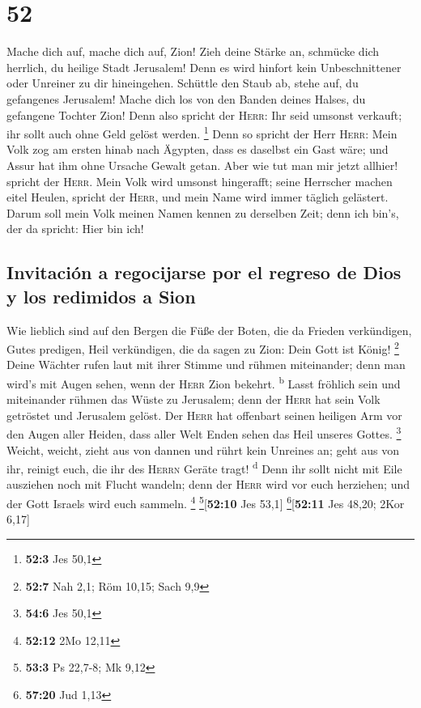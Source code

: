 \hypertarget{section-51}{%
\section{52}\label{section-51}}

 Mache dich auf, mache dich auf, Zion! Zieh deine Stärke
an, schmücke dich herrlich, du heilige Stadt Jerusalem! Denn es wird
hinfort kein Unbeschnittener oder Unreiner zu dir hineingehen.
 Schüttle den Staub ab, stehe auf, du gefangenes
Jerusalem! Mache dich los von den Banden deines Halses, du gefangene
Tochter Zion!  Denn also spricht der \textsc{Herr}: Ihr
seid umsonst verkauft; ihr sollt auch ohne Geld gelöst werden.
\footnote{\textbf{52:3} Jes 50,1}  Denn so spricht der
Herr \textsc{Herr}: Mein Volk zog am ersten hinab nach Ägypten, dass es
daselbst ein Gast wäre; und Assur hat ihm ohne Ursache Gewalt getan.
 Aber wie tut man mir jetzt allhier! spricht der
\textsc{Herr}. Mein Volk wird umsonst hingerafft; seine Herrscher machen
eitel Heulen, spricht der \textsc{Herr}, und mein Name wird immer
täglich gelästert.  Darum soll mein Volk meinen Namen
kennen zu derselben Zeit; denn ich bin's, der da spricht: Hier bin ich!

\hypertarget{invitaciuxf3n-a-regocijarse-por-el-regreso-de-dios-y-los-redimidos-a-sion}{%
\subsection{Invitación a regocijarse por el regreso de Dios y los
redimidos a
Sion}\label{invitaciuxf3n-a-regocijarse-por-el-regreso-de-dios-y-los-redimidos-a-sion}}

 Wie lieblich sind auf den Bergen die Füße der Boten, die
da Frieden verkündigen, Gutes predigen, Heil verkündigen, die da sagen
zu Zion: Dein Gott ist König! \footnote{\textbf{52:7} Nah 2,1; Röm
  10,15; Sach 9,9}  Deine Wächter rufen laut mit ihrer
Stimme und rühmen miteinander; denn man wird's mit Augen sehen, wenn der
\textsc{Herr} Zion bekehrt. \textsuperscript{b}  Lasst
fröhlich sein und miteinander rühmen das Wüste zu Jerusalem; denn der
\textsc{Herr} hat sein Volk getröstet und Jerusalem gelöst.
 Der \textsc{Herr} hat offenbart seinen heiligen Arm vor
den Augen aller Heiden, dass aller Welt Enden sehen das Heil unseres
Gottes. \footnote{\textbf{54:6} Jes 50,1}  Weicht,
weicht, zieht aus von dannen und rührt kein Unreines an; geht aus von
ihr, reinigt euch, die ihr des \textsc{Herrn} Geräte tragt!
\textsuperscript{d}  Denn ihr sollt nicht mit Eile
ausziehen noch mit Flucht wandeln; denn der \textsc{Herr} wird vor euch
herziehen; und der Gott Israels wird euch sammeln. \footnote{\textbf{52:12}
  2Mo 12,11} \footnote{\textbf{53:3} Ps 22,7-8; Mk 9,12}{[}\textbf{52:10}
Jes 53,1{]} \footnote{\textbf{57:20} Jud 1,13}{[}\textbf{52:11} Jes
48,20; 2Kor 6,17{]}

